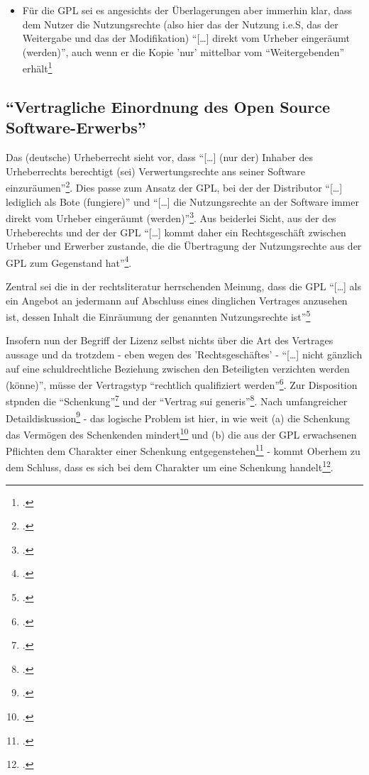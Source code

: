 \documentclass[DIV=calc,BCOR=5mm,11pt,headings=small,oneside,abstract=true, toc=bib]{scrartcl}
\begin{document}
\begin{itemize}
  \enquote{Miturheberschaft} nicht der Umfang, sondern die Qualität des
  Beitrages anzusetzen sei\footcite[vgl.][79 und 83f]{Oberhem2008a}. Und daneben
  stünden wiederum der \enquote{Nutzer}\footcite[vgl.][85]{Oberhem2008a} und
  verschiedene Arten der Distributoren\footcite[vgl.][85ff]{Oberhem2008a}.
  \item Für die GPL sei es angesichts der Überlagerungen aber immerhin klar,
  dass dem Nutzer die Nutzungsrechte (also hier das der Nutzung i.e.S, das der
  Weitergabe und das der Modifikation) \enquote{[\ldots] direkt vom Urheber
  eingeräumt (werden)}, auch wenn er die Kopie 'nur' mittelbar vom
  \enquote{Weitergebenden} erhält\footcite[vgl.][90]{Oberhem2008a}
\end{itemize}

\subsection{\enquote{Vertragliche Einordnung des Open Source
Software-Erwerbs}}

Das (deutsche) Urheberrecht sieht vor, dass \enquote{[\ldots] (nur der)
Inhaber des Urheberrechts berechtigt (sei) Verwertungsrechte ans seiner
Software einzuräumen}\footcite[vgl.][103]{Oberhem2008a}. Dies passe zum
Ansatz der GPL, bei der der Distributor \enquote{[\ldots] lediglich als Bote
(fungiere)} und \enquote{[\ldots] die Nutzungsrechte an der Software
immer direkt vom Urheber eingeräumt
(werden)}\footcite[vgl.][104]{Oberhem2008a}. Aus beiderlei Sicht, aus der
des Urheberechts und der der GPL \enquote{[\ldots] kommt daher ein
Rechtsgeschäft zwischen Urheber und Erwerber zustande, die die
Übertragung der Nutzungsrechte aus der GPL zum Gegenstand
hat}\footcite[vgl.][104]{Oberhem2008a}.

Zentral sei die in der rechtsliteratur herrschenden Meinung, dass die GPL
\enquote{[\ldots] als ein Angebot an jedermann auf Abschluss eines
dinglichen Vertrages anzusehen ist, dessen Inhalt die Einräumung der
genannten Nutzungsrechte ist}\footcite[vgl.][104]{Oberhem2008a}

Insofern nun der Begriff der Lizenz selbst nichts über die Art des Vertrages
aussage und da trotzdem - eben wegen des 'Rechtsgeschäftes' - \enquote{[\ldots]
nicht gänzlich auf eine schuldrechtliche Beziehung zwischen den Beteiligten
verzichten werden (könne)}, müsse der Vertragstyp \enquote{rechtlich
qualifiziert werden}\footcite[vgl.][105]{Oberhem2008a}. Zur Disposition
stpnden die \enquote{Schenkung}\footcite[vgl.][106ff]{Oberhem2008a} und der
\enquote{Vertrag sui generis}\footcite[vgl.][109]{Oberhem2008a}. Nach
umfangreicher Detaildiskussion\footcite[vgl.][112ff]{Oberhem2008a} - das
logische Problem ist hier, in wie weit (a) die Schenkung das Vermögen des
Schenkenden mindert\footcite[vgl.][118ff]{Oberhem2008a} und (b) die aus
der GPL erwachsenen Pflichten dem Charakter einer Schenkung
entgegenstehen\footcite[vgl.][122ff]{Oberhem2008a} - kommt Oberhem zu dem
Schluss, dass es sich bei dem Charakter um eine Schenkung
handelt\footcite[vgl.][128]{Oberhem2008a}.
\end{document}
